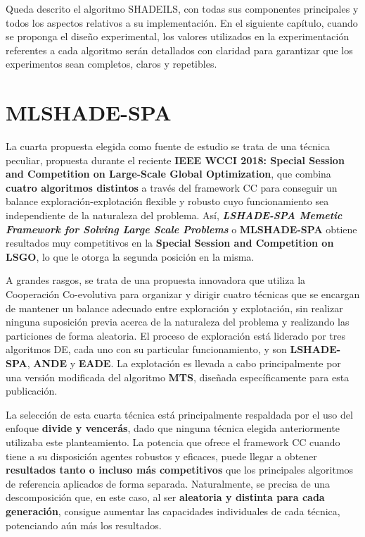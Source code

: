 Queda descrito el algoritmo SHADEILS, con todas sus componentes principales y todos los aspectos relativos a su implementación. En el siguiente capítulo, cuando se proponga el diseño experimental, los valores utilizados en la experimentación referentes a cada algoritmo serán detallados con claridad para garantizar que los experimentos sean completos, claros y repetibles. 

\section{MLSHADE-SPA}

La cuarta propuesta elegida como fuente de estudio se trata de una técnica peculiar, propuesta durante el reciente \textbf{IEEE WCCI 2018: Special Session and Competition on Large-Scale Global Optimization}\cite{WCCI-SHADEILS}, que combina \textbf{cuatro algoritmos distintos} a través del framework CC\cite{CCoevo} para conseguir un balance exploración-explotación flexible y robusto cuyo funcionamiento sea independiente de la naturaleza del problema. Así, \textbf{\textit{LSHADE-SPA Memetic Framework for Solving Large Scale Problems}} o \textbf{MLSHADE-SPA}\cite{ML-SHADE-SPA} obtiene resultados muy competitivos en la \textbf{Special Session and Competition on LSGO}, lo que le otorga la segunda posición en la misma.

A grandes rasgos, se trata de una propuesta innovadora que utiliza la Cooperación Co-evolutiva\cite{CCoevo} para organizar y dirigir cuatro técnicas que se encargan de mantener un balance adecuado entre exploración y explotación, sin realizar ninguna suposición previa acerca de la naturaleza del problema y realizando las particiones de forma aleatoria. El proceso de exploración está liderado por tres algoritmos DE, cada uno con su particular funcionamiento, y son \textbf{LSHADE-SPA}\cite{LSHADESPA}, \textbf{ANDE}\cite{ANDE} y \textbf{EADE}\cite{EADE}. La explotación es llevada a cabo principalmente por una versión modificada del algoritmo \textbf{MTS}\cite{MTS-LSGO}, diseñada específicamente para esta publicación.

La selección de esta cuarta técnica está principalmente respaldada por el uso del enfoque \textbf{divide y vencerás}, dado que ninguna técnica elegida anteriormente utilizaba este planteamiento. La potencia que ofrece el framework CC\cite{CCoevo} cuando tiene a su disposición agentes robustos y eficaces, puede llegar a obtener \textbf{resultados tanto o incluso más competitivos} que los principales algoritmos de referencia aplicados de forma separada. Naturalmente, se precisa de una descomposición que, en este caso, al ser \textbf{aleatoria y distinta para cada generación}, consigue aumentar las capacidades individuales de cada técnica, potenciando aún más los resultados.

